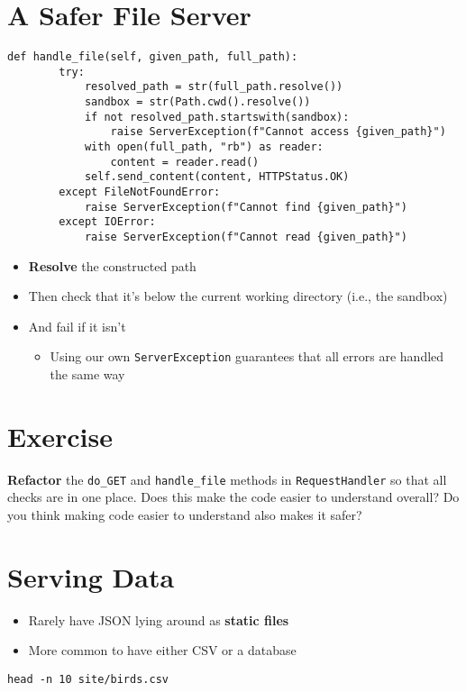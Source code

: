 \documentclass[krantzl]{krantz}
\newcommand{\glossref}[1]{\textbf{#1}}
\begin{document}
\section{A Safer File Server}
\begin{lstlisting}[frame=tblr]
    def handle_file(self, given_path, full_path):
        try:
            resolved_path = str(full_path.resolve())
            sandbox = str(Path.cwd().resolve())
            if not resolved_path.startswith(sandbox):
                raise ServerException(f"Cannot access {given_path}")
            with open(full_path, "rb") as reader:
                content = reader.read()
            self.send_content(content, HTTPStatus.OK)
        except FileNotFoundError:
            raise ServerException(f"Cannot find {given_path}")
        except IOError:
            raise ServerException(f"Cannot read {given_path}")
\end{lstlisting}

\begin{itemize}
\item \glossref{Resolve} the constructed path

\item Then check that it’s below the current working directory (i.e., the sandbox)

\item And fail if it isn’t\begin{itemize}
\item Using our own \texttt{ServerException} guarantees that all errors are handled the same way

\end{itemize}


\end{itemize}
\section{Exercise}

\glossref{Refactor} the \texttt{do\_GET} and \texttt{handle\_file} methods in \texttt{RequestHandler}
so that all checks are in one place.
Does this make the code easier to understand overall?
Do you think making code easier to understand also makes it safer?

\section{Serving Data}
\begin{itemize}
\item Rarely have JSON lying around as \glossref{static files}

\item More common to have either CSV or a database

\end{itemize}
\begin{lstlisting}[frame=tblr]
head -n 10 site/birds.csv
\end{lstlisting}
\end{document}

